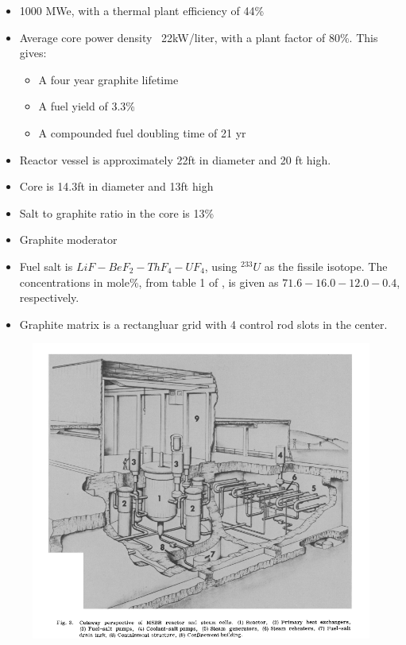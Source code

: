\documentclass[letterpaper]{article}
\begin{document}
\begin{itemize}
\item 1000 MWe, with a thermal plant efficiency of 44\%
\item Average core power density ~22kW/liter, with a plant factor of 80\%.  This gives:
	\begin{itemize}
	\item A four year graphite lifetime
	\item A fuel yield of 3.3\%
	\item A compounded fuel doubling time of 21 yr
	\end{itemize}
\item Reactor vessel is approximately 22ft in diameter and 20 ft high.
\item Core is 14.3ft in diameter and 13ft high
\item Salt to graphite ratio in the core is 13\%
\item Graphite moderator
\item Fuel salt is $LiF - BeF_2 - ThF_4 - UF_4$, using ${}^{233}U$ as the fissile isotope.  The concentrations in mole\%, from table 1 of \cite{bettis_design_1970}, is given as $71.6 - 16.0 - 12.0 - 0.4$, respectively.
\item Graphite matrix is a rectangluar grid with 4 control rod slots in the center.
\end{itemize}

\begin{figure}[H]
  \centering
  \includegraphics[width=1.0\linewidth]{figures/MSBRsource1.png}
  \label{fig:fig3}
\end{figure}
\end{document}
